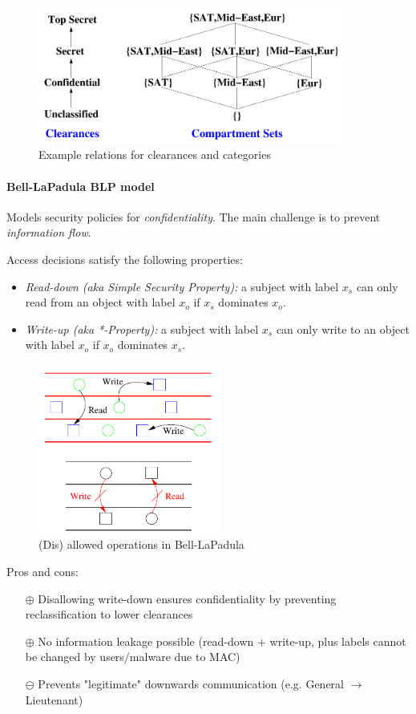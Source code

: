 \begin{figure}[h]
    \centering
    \includegraphics[width=10cm]{images/ch11-ac-lattice-example.png}
    \caption{Example relations for clearances and categories}
    \label{fig:ac-lattice-example}
\end{figure}

\paragraph{Bell-LaPadula BLP model} Models security policies for \emph{confidentiality}. The main challenge is to prevent \emph{information flow}.

Access decisions satisfy the following properties:
\begin{itemize}
    \item \emph{Read-down (aka Simple Security Property):} a subject with label $x_s$ can only read from an object with label $x_o$ if $x_s$ dominates $x_o$.
    \item \emph{Write-up (aka *-Property):}  a subject with label $x_s$ can only write to an object with label $x_o$ if $x_o$ dominates $x_s$.
\end{itemize}
\begin{figure}[h]
    \centering
    \includegraphics[width=6cm]{images/ch11-ac-blp.png}
    \caption{(Dis) allowed operations in Bell-LaPadula}
    \label{fig:ac-blp}
\end{figure}

Pros and cons:
\begin{itemize}
    \item[$\oplus$] Disallowing write-down ensures confidentiality by preventing reclassification to lower clearances
    \item[$\oplus$] No information leakage possible (read-down + write-up, plus labels cannot be changed by users/malware due to MAC)
    \item[$\ominus$] Prevents "legitimate" downwards communication (e.g. General $\rightarrow$ Lieutenant)
\end{itemize}

